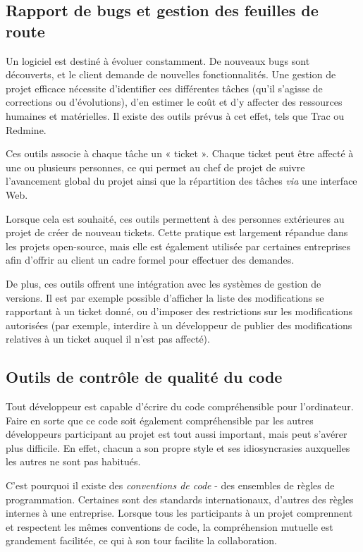 \subsection{Rapport de bugs et gestion des feuilles de route}

Un logiciel est destiné à évoluer constamment. De nouveaux bugs sont découverts, et le client demande de nouvelles fonctionnalités. Une gestion de projet efficace nécessite d’identifier ces différentes tâches (qu’il s’agisse de corrections ou d’évolutions), d’en estimer le coût et d’y affecter des ressources humaines et matérielles. Il existe des outils prévus à cet effet, tels que Trac ou Redmine.

Ces outils associe à chaque tâche un « ticket ». Chaque ticket peut être affecté à une ou plusieurs personnes, ce qui permet au chef de projet de suivre l’avancement global du projet ainsi que la répartition des tâches \textit{via} une interface Web.

Lorsque cela est souhaité, ces outils permettent à des personnes extérieures au projet de créer de nouveau tickets. Cette pratique est largement répandue dans les projets open-source, mais elle est également utilisée par certaines entreprises afin d’offrir au client un cadre formel pour effectuer des demandes.

De plus, ces outils offrent une intégration avec les systèmes de gestion de versions. Il est par exemple possible d’afficher la liste des modifications se rapportant à un ticket donné, ou d’imposer des restrictions sur les modifications autorisées (par exemple, interdire à un développeur de publier des modifications relatives à un ticket auquel il n’est pas affecté).

\subsection{Outils de contrôle de qualité du code}

Tout développeur est capable d’écrire du code compréhensible pour l’ordinateur. Faire en sorte que ce code soit également compréhensible par les autres développeurs participant au projet est tout aussi important, mais peut s’avérer plus difficile. En effet, chacun a son propre style et ses idiosyncrasies auxquelles les autres ne sont pas habitués.

C’est pourquoi il existe des \textit{conventions de code} - des ensembles de règles de programmation. Certaines sont des standards internationaux, d’autres des règles internes à une entreprise. Lorsque tous les participants à un projet comprennent et respectent les mêmes conventions de code, la compréhension mutuelle est grandement facilitée, ce qui à son tour facilite la collaboration.

